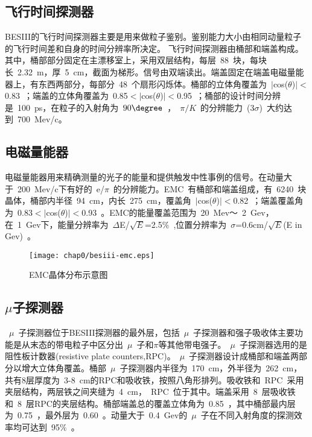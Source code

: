 \subsection{飞行时间探测器}
BESIII的飞行时间探测器主要是用来做粒子鉴别。鉴别能力大小由相同动量粒子的飞行时间差和自身的时间分辨率所决定。
飞行时间探测器由桶部和端盖构成。其中，桶部部分固定在主漂移室上，采用双层结构，每层~88~块，每块长~2.32~m，厚~5~cm，截面为梯形。信号由双端读出。端盖固定在端盖电磁量能器上，有东西两部分，每部分~48~个扇形闪烁体。桶部的立体角覆盖为~$|$cos($\theta$)$|<$0.83~；端盖的立体角覆盖为~0.85$<|$cos($\theta$)$|<$0.95~；桶部的设计时间分辨是~100~ps，在粒子的入射角为~$90\degree$~，~$\pi/K$~的分辨能力~(3$\sigma$)~大约达到~700~Mev/c。

\subsection{电磁量能器}

电磁量能器用来精确测量的光子的能量和提供触发中性事例的信号。在动量大于~200~Mev/c下有好的~e/$\pi$~的分辨能力。EMC~有桶部和端盖组成，有~6240~块晶体，桶部内半径~94~cm，内长~275~cm，覆盖角~$|$cos($\theta$)$|<$0.82~；端盖覆盖角为~0.83$<|$cos($\theta$)$|<$0.93~。EMC的能量覆盖范围为~20~Mev～~2~Gev，在~1~Gev下，能量分辨率为~$\Delta$E/$\sqrt E$=2.5$\%$~,位置分辨率为~$\sigma$=0.6cm/$\sqrt E$(E in Gev)~。
\begin{figure}[!h]
  \centering
  \texttt{[image: chap0/besiii-emc.eps]}
  \caption{EMC晶体分布示意图}
  \label{fig:besiii-emc}
\end{figure}

\subsection{$\mu$子探测器}

~$\mu$~子探测器位于BESIII探测器的最外层，包括~$\mu$~子探测器和强子吸收体主要功能是从末态的带电粒子中区分出~$\mu$~子和$\pi$等其他带电强子。~$\mu$~子探测器选用的是阻性板计数器(resistive plate counters,RPC)。~$\mu$~子探测器设计成桶部和端盖两部分以增大立体角覆盖。桶部~$\mu$~子探测器内半径为~170~cm，外半径为~262~cm，共有8层厚度为~3-8~cm的RPC和吸收铁，按照八角形排列。吸收铁和~RPC~采用夹层结构，两层铁之间夹缝为~4~cm，~RPC~位于其中。端盖采用~8~层吸收铁和~8~层RPC的夹层结构。桶部端盖总的覆盖立体角为~0.85~，其中桶部最内层为~0.75~，最外层为~0.60~。动量大于~0.4~Gev的~$\mu$~子在不同入射角度的探测效率均可达到~95$\%$~。


